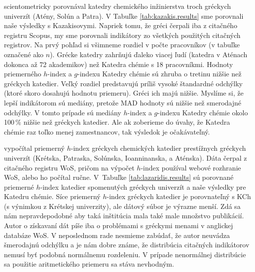 \citet{Kazakis2015} scientometricky porovnával katedry chemického inžinierstva
troch gréckych univerzít (Atény, Solún a Patra).  V Tabuľke
\ref{tab:kazakis.results} sme porovnali naše výsledky s Kazakisovymi. Napriek
tomu, že gréci čerpali iba z citačného registru Scopus, my sme porovnali
indikátory zo všetkých použitých citačných registrov. Na prvý pohľad si
všimneme rozdiel v počte pracovníkov (v tabuľke označené ako $n$).  Grécke
katedry zahrňujú ďaleko viacej ľudí (katedra v Aténach dokonca až 72
akademikov) než Katedra chémie s 18 pracovníkmi.  Hodnoty priemerného $h$-index
a $g$-indexu Katedry chémie sú  zhruba o tretinu nižšie než gréckych katedier.
Veľký rozdiel predstavujú príliš vysoké štandardné odchýlky (ktoré skoro
dosahujú hodnotu priemeru). Gréci ich majú nižšie.  Myslíme si, že lepší
indikátorom sú mediány, pretože MAD hodnoty sú nižšie než smerodajné odchýlky.
V tomto prípade sú mediány $h$-index a $g$-indexu Katedry chémie okolo 100\,\%
nižšie než gréckych katedier. Ale ak zoberieme do úvahy, že Katedra chémie raz
toľko menej zamestnancov, tak výsledok je očakávateľný.


\citet{Lazaridis2010} vypočítal priemerný $h$-index gréckych chemických
katedier prestížnych gréckych univerzít (Krétska, Patraska, Solúnska,
Ioanninanska, a Aténska).  Dáta čerpal z citačného registru WoS, pričom na
výpočet $h$-index používal webové rozhranie WoS, alebo ho počítal ručne. 
V~Tabuľke \ref{tab:lazaridis.results} sú porovnané priemerné $h$-index katedier
spomenutých gréckych univerzít a naše výsledky pre Katedru chémie. Síce
priemerný $h$-index gréckych katedier je porovnateľný s KCh (s výnimkou z
Krétskej univerzity), ale dátový súbor je výrazne menší. Zdá sa nám
nepravdepodobné aby taká inštitúcia mala také male množstvo publikácií.  Autor
o získavaní dát píše iba o problémami s gréckymi menami v anglickej databáze
WoS. V neposlednom rade nesmieme zabúdať, že autor neuvádza šmerodajnú odchýlku
a je nám dobre známe, že distribúcia citačných indikátorov nemusí byť podobná
normálnemu rozdeleniu. V prípade nenormálnej distribúcie sa použitie
aritmetického priemeru sa stáva nevhodným.

